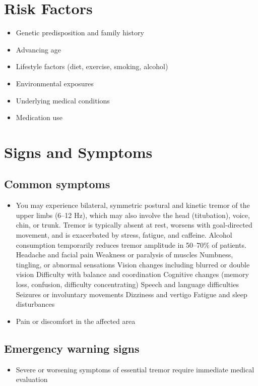 \section{Risk Factors}
\begin{itemize}[noitemsep]
  \item Genetic predisposition and family history
  \item Advancing age
  \item Lifestyle factors (diet, exercise, smoking, alcohol)
  \item Environmental exposures
  \item Underlying medical conditions
  \item Medication use
\end{itemize}
\section{Signs and Symptoms}

\subsection{Common symptoms}
\begin{itemize}[noitemsep]
  \item You may experience bilateral, symmetric postural and kinetic tremor of the upper limbs (6--12 Hz), which may also involve the head (titubation), voice, chin, or trunk. Tremor is typically absent at rest, worsens with goal-directed movement, and is exacerbated by stress, fatigue, and caffeine. Alcohol consumption temporarily reduces tremor amplitude in 50--70\% of patients. Headache and facial pain Weakness or paralysis of muscles Numbness, tingling, or abnormal sensations Vision changes including blurred or double vision Difficulty with balance and coordination Cognitive changes (memory loss, confusion, difficulty concentrating) Speech and language difficulties Seizures or involuntary movements Dizziness and vertigo Fatigue and sleep disturbances
  \item Pain or discomfort in the affected area
  \end{itemize}

\subsection{Emergency warning signs}
\begin{itemize}[noitemsep]
  \item Severe or worsening symptoms of essential tremor require immediate medical evaluation
\end{itemize}

